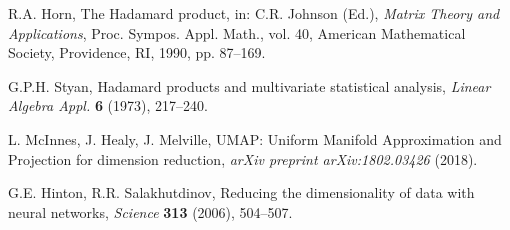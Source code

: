 \documentclass[11pt]{amsart}
\theoremstyle{plain}
\theoremstyle{definition}
\theoremstyle{remark}
\begin{document}
\begin{thebibliography}{99}

R.A. Horn, The Hadamard product, in: C.R. Johnson (Ed.), \emph{Matrix Theory and Applications}, Proc. Sympos. Appl. Math., vol. 40, American Mathematical Society, Providence, RI, 1990, pp. 87--169.

G.P.H. Styan, Hadamard products and multivariate statistical analysis, \emph{Linear Algebra Appl.} \textbf{6} (1973), 217--240.

L. McInnes, J. Healy, J. Melville, UMAP: Uniform Manifold Approximation and Projection for dimension reduction, \emph{arXiv preprint arXiv:1802.03426} (2018).

G.E. Hinton, R.R. Salakhutdinov, Reducing the dimensionality of data with neural networks, \emph{Science} \textbf{313} (2006), 504--507.

\end{thebibliography}
\end{document}
